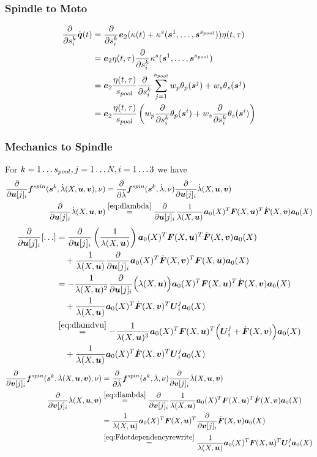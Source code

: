 \subsubsection{Spindle to Moto}
\begin{align}
	\frac{\partial }{\partial s^k_i}\dot{\boldsymbol{q}}(t) &= \frac{\partial }{\partial s^k_i}\boldsymbol{e}_2(\kappa(t) + \kappa^s(\boldsymbol{s}^1,\ldots,\boldsymbol{s}^{s_{pool}}))\eta(t,\tau)\\
	&= \boldsymbol{e}_2\eta(t,\tau)\frac{\partial }{\partial s^k_i}\kappa^s(\boldsymbol{s}^1,\ldots,\boldsymbol{s}^{s_{pool}})\\
	&= \boldsymbol{e}_2\frac{\eta(t,\tau)}{{s_{pool}}}\frac{\partial }{\partial s^k_i}\sum\limits_{j=1}^{{s_{pool}}} w_p\theta_p(\boldsymbol{s}^j) + w_s\theta_s(\boldsymbol{s}^j)\\
	&= \boldsymbol{e}_2\frac{\eta(t,\tau)}{{s_{pool}}}\left(w_p\frac{\partial }{\partial s^k_i}\theta_p(\boldsymbol{s}^i) + w_s\frac{\partial }{\partial s^k_i}\theta_s(\boldsymbol{s}^i)\right)
\end{align}

\subsubsection{Mechanics to Spindle}
For $k=1\ldots{s_{pool}}, j = 1\ldots N, i=1\ldots3$ we have
\begin{align}
	\d{}{\vu[j]_i}\fsp(\vs^k,\dla(X,\vu,\vv),\nu) &= \d{}{\dla}\fsp(\vs^k,\dla,\nu)\d{}{\vu[j]_i}\dla(X,\vu,\vv)\\
	\d{}{\vu[j]_i}\dla(X,\vu,\vv) &\re{eq:dlambda} \d{}{\vu[j]_i}\frac{1}{\la(X,\vu)}\va_0(X)^T\vF(X,\vu)^T\dot{\vF}(X,\vv)\va_0(X)
\end{align}
\begin{align*}
   \d{}{\vu[j]_i} [\ldots] &= \d{}{\vu[j]_i}\left(\frac{1}{\la(X,\vu)}\right)\va_0(X)^T\vF(X,\vu)^T\dot{\vF}(X,\vv)\va_0(X)\\
   &\quad+ \frac{1}{\la(X,\vu)}\d{}{\vu[j]_i}\va_0(X)^T\dot{\vF}(X,\vv)^T\vF(X,\vu)\va_0(X)\\
   &= -\frac{1}{\la(X,\vu)^2}\d{}{\vu[j]_i}\Bigl(\la(X,\vu)\Bigr)\va_0(X)^T\vF(X,\vu)^T\dot{\vF}(X,\vv)\va_0(X)\\
   &\quad+ \frac{1}{\la(X,\vu)}\va_0(X)^T\dot{\vF}(X,\vv)^T\vU_i^j\va_0(X)\\
   &\re{eq:dlamdvu} -\frac{1}{\la(X,\vu)^3}\va_0(X)^T\vF(X,\vu)^T\Bigl(\vU_i^j+\dot{\vF}(X,\vv)\Bigr)\va_0(X)\\
   &\quad+ \frac{1}{\la(X,\vu)}\va_0(X)^T\dot{\vF}(X,\vv)^T\vU_i^j\va_0(X)
\end{align*}
\begin{align}
	\d{}{\vv[j]_i}\fsp(\vs^k,\dla(X,\vu,\vv),\nu) &= \d{}{\dla}\fsp(\vs^k,\dla,\nu)\d{}{\vv[j]_i}\dla(X,\vu,\vv)\\
	\d{}{\vv[j]_i}\dla(X,\vu,\vv) &\re{eq:dlambda} \d{}{\vv[j]_i}\frac{1}{\la(X,\vu)}\va_0(X)^T\vF(X,\vu)^T\dot{\vF}(X,\vv)\va_0(X)\\
		&=\frac{1}{\la(X,\vu)}\va_0(X)^T\vF(X,\vu)^T\d{}{\vv[j]_i}\dot{\vF}(X,\vv)\va_0(X)\\
		&\re{eq:Fdotdependencyrewrite}\frac{1}{\la(X,\vu)}\va_0(X)^T\vF(X,\vu)^T\vU^j_i\va_0(X)
\end{align}

